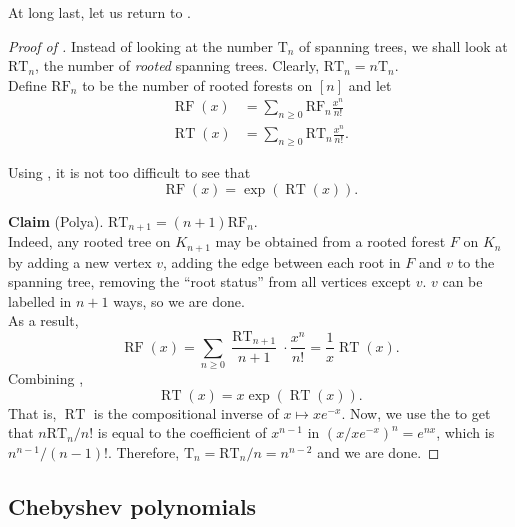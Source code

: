 	At long last, let us return to .

	\begin{proof}[Proof of ]
		Instead of looking at the number $\text{T}_n$ of spanning trees, we shall look at $\text{RT}_n$, the number of \emph{rooted} spanning trees. Clearly, $\text{RT}_n = n \text{T}_n$.\\
		Define $\text{RF}_n$ to be the number of rooted forests on $[n]$ and let
		\begin{align*}
			\operatorname{RF}(x) &= \sum_{n \ge 0} \text{RF}_n \frac{x^n}{n!} \\
			\operatorname{RT}(x) &= \sum_{n \ge 0} \text{RT}_n \frac{x^n}{n!}.
		\end{align*}

		Using , it is not too difficult to see that
		\begin{equation}
			\label{eqn 1}
			\operatorname{RF}(x) = \exp(\operatorname{RT}(x)).
		\end{equation}

		\textbf{Claim} (Polya). $\text{RT}_{n+1} = (n+1) \text{RF}_n$.\\
		Indeed, any rooted tree on $K_{n+1}$ may be obtained from a rooted forest $F$ on $K_n$ by adding a new vertex $v$, adding the edge between each root in $F$ and $v$ to the spanning tree, removing the ``root status'' from all vertices except $v$. $v$ can be labelled in $n+1$ ways, so we are done.\\

		As a result,
		\begin{equation}
			\label{eqn 2}
			\operatorname{RF}(x) = \sum_{n\ge 0} \frac{\operatorname{RT}_{n+1}}{n+1} \cdot \frac{x^n}{n!} = \frac{1}{x} \operatorname{RT}(x).
		\end{equation}
		Combining ,
		\[ \operatorname{RT}(x) = x \exp(\operatorname{RT}(x)). \]
		That is, $\operatorname{RT}$ is the compositional inverse of $x \mapsto xe^{-x}$.
		Now, we use the  to get that $n\text{RT}_n/n!$ is equal to the coefficient of $x^{n-1}$ in $(x/xe^{-x})^n = e^{nx}$, which is $n^{n-1}/(n-1)!$. Therefore, $\text{T}_n = \text{RT}_n/n = n^{n-2}$ and we are done.
	\end{proof}


\subsection{Chebyshev polynomials}

